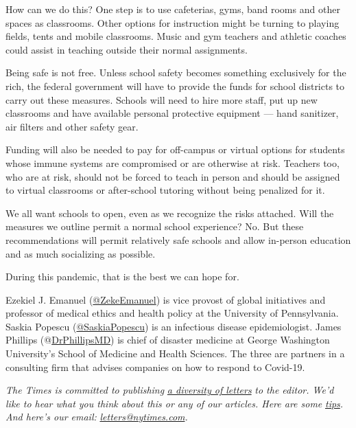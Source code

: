 How can we do this? One step is to use cafeterias, gyms, band rooms and
other spaces as classrooms. Other options for instruction might be
turning to playing fields, tents and mobile classrooms. Music and gym
teachers and athletic coaches could assist in teaching outside their
normal assignments.

Being safe is not free. Unless school safety becomes something
exclusively for the rich, the federal government will have to provide
the funds for school districts to carry out these measures. Schools will
need to hire more staff, put up new classrooms and have available
personal protective equipment --- hand sanitizer, air filters and other
safety gear.

Funding will also be needed to pay for off-campus or virtual options for
students whose immune systems are compromised or are otherwise at risk.
Teachers too, who are at risk, should not be forced to teach in person
and should be assigned to virtual classrooms or after-school tutoring
without being penalized for it.

We all want schools to open, even as we recognize the risks attached.
Will the measures we outline permit a normal school experience? No. But
these recommendations will permit relatively safe schools and allow
in-person education and as much socializing as possible.

During this pandemic, that is the best we can hope for.

Ezekiel J. Emanuel
(\href{https://twitter.com/zekeemanuel?lang=en}{@ZekeEmanuel}) is vice
provost of global initiatives and professor of medical ethics and health
policy at the University of Pennsylvania. Saskia Popescu
(\href{https://twitter.com/SaskiaPopescu?ref_src=twsrc\%5Egoogle\%7Ctwcamp\%5Eserp\%7Ctwgr\%5Eauthor}{@SaskiaPopescu})
is an infectious disease epidemiologist. James Phillips
(@\href{https://twitter.com/DrPhillipsMD}{DrPhillipsMD}) is chief of
disaster medicine at George Washington University's School of Medicine
and Health Sciences. The three are partners in a consulting firm that
advises companies on how to respond to Covid-19.

\emph{The Times is committed to publishing}
\href{https://www.nytimes.com/2019/01/31/opinion/letters/letters-to-editor-new-york-times-women.html}{\emph{a
diversity of letters}} \emph{to the editor. We'd like to hear what you
think about this or any of our articles. Here are some}
\href{https://help.nytimes.com/hc/en-us/articles/115014925288-How-to-submit-a-letter-to-the-editor}{\emph{tips}}\emph{.
And here's our email:}
\href{mailto:letters@nytimes.com}{\emph{letters@nytimes.com}}\emph{.}

